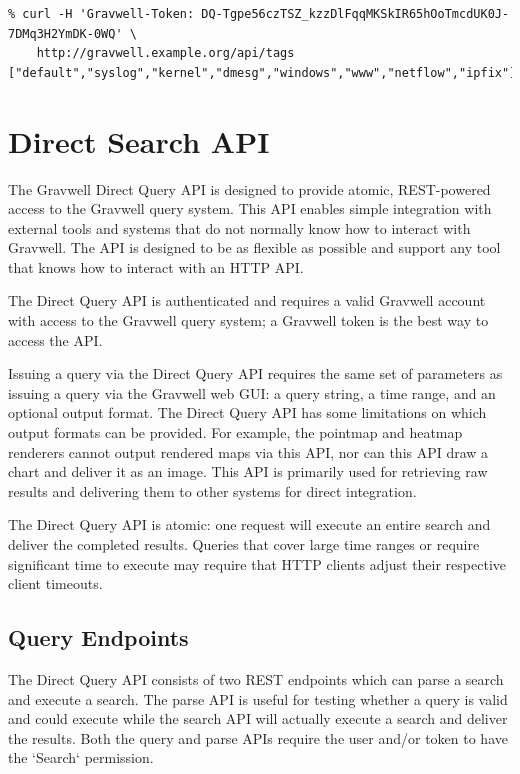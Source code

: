 \begin{verbatim}
% curl -H 'Gravwell-Token: DQ-Tgpe56czTSZ_kzzDlFqqMKSkIR65hOoTmcdUK0J-7DMq3H2YmDK-0WQ' \
	http://gravwell.example.org/api/tags
["default","syslog","kernel","dmesg","windows","www","netflow","ipfix"]
\end{verbatim}

\section{Direct Search API}
The Gravwell Direct Query API is designed to provide atomic, REST-powered access to the Gravwell query system.  This API enables simple integration with external tools and systems that do not normally know how to interact with Gravwell.  The API is designed to be as flexible as possible and support any tool that knows how to interact with an HTTP API.

The Direct Query API is authenticated and requires a valid Gravwell account with access to the Gravwell query system; a Gravwell token is the best way to access the API.

Issuing a query via the Direct Query API requires the same set of parameters as issuing a query via the Gravwell web GUI: a query string, a time range, and an optional output format.  The Direct Query API has some limitations on which output formats can be provided.  For example, the pointmap and heatmap renderers cannot output rendered maps via this API, nor can this API draw a chart and deliver it as an image.  This API is primarily used for retrieving raw results and delivering them to other systems for direct integration.

The Direct Query API is atomic: one request will execute an entire search and deliver the completed results.  Queries that cover large time ranges or require significant time to execute may require that HTTP clients adjust their respective client timeouts.

\subsection{Query Endpoints}

The Direct Query API consists of two REST endpoints which can parse a search and execute a search.  The parse API is useful for testing whether a query is valid and could execute while the search API will actually execute a search and deliver the results.  Both the query and parse APIs require the user and/or token to have the `Search` permission.

